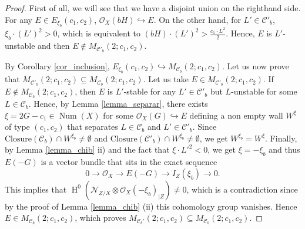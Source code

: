 \documentclass[11pt,twoside]{amsart}
\theoremstyle{definition}
\newcommand {\Closure}{\mathrm{Closure}}
\newcommand{\Num}{\operatorname{Num}}
\newcommand{\Ho}{\operatorname{H}}
\begin{document}
\begin{proof}


    First of all, we will see that we have a disjoint union on the righthand side. 
    For any $E\in E_{\xi_b}(c_1,c_2)$,  $\mathcal{O}_X(bH)\hookrightarrow E$. On the other hand, for $L'\in \mathcal{C}'_b$, $\xi_b\cdot (L')^2>0$, which is equivalent to $(bH)\cdot (L')^2>\frac{c_1\cdot L^2}{2}$. Hence, $E$ is $L'$-unstable and then $E\not\in M_{\mathcal{C}'_b}(2;c_1,c_2)$.
    
      By Corollary \ref{cor_inclusion}, $E_{\xi_b}( c_1,c_2)\hookrightarrow M_{\mathcal{C}_b}(2;  c_1,c_2)$.
Let us now prove that $M_{\mathcal{C}'_b}(2;c_1,c_2)\subseteq M_{\mathcal{C}_b}(2;c_1,c_2).$
Let us take $E\in M_{\mathcal{C}'_b}(2;c_1,c_2)$.
  If $E\not \in M_{\mathcal{C}_b}(2;c_1,c_2)$, then $E$ is $L'$-stable for any $L'\in \mathcal{C}'_b$ but $L$-unstable for some $L\in \mathcal{C}_b$. %
  Hence, by Lemma \ref{lemma_separar}, there exists $\xi=2G-c_1\in\Num(X)$ for some $\mathcal{O}_X(G)\hookrightarrow E$ defining a non empty wall $W^{\xi}$ of type $(c_1,c_2)$ that separates $L\in\mathcal{C}_b$ and $L'\in \mathcal{C}'_b$. Since $\Closure(\mathcal{C}_b)\cap W^{\xi_b}\neq \emptyset$ and $\Closure(\mathcal{C}'_b)\cap W^{\xi_b}\neq \emptyset$, we get $W^{\xi_b}=W^{\xi}$.
    Finally, by Lemma \ref{lemma_chib} ii) and the fact that $\xi\cdot {L'}^2<0$, we get $\xi=-\xi_b$ and thus $E(-G)$ is a vector bundle that sits in the exact sequence $$0\rightarrow\mathcal{O}_X\rightarrow E(-G)\rightarrow I_Z(\xi_b)\rightarrow0.$$ This implies that $\Ho^0\left({\mathcal{N}_{Z/X}}\otimes\mathcal{O}_X(-\xi_b)_{|Z}\right)\neq0$, which is a contradiction since by the proof of Lemma \ref{lemma_chib} (ii) this cohomology group vanishes. Hence $E\in M_{\mathcal{C}_b}(2;c_1,c_2)$, which proves $M_{\mathcal{C}_b'}(2;c_1,c_2)\subseteq M_{\mathcal{C}_b}(2;c_1,c_2)$.
   

\end{proof}
\end{document}
